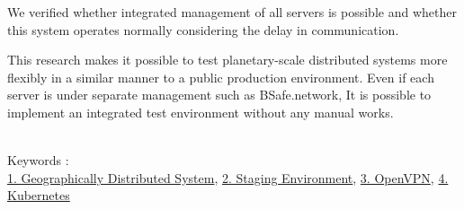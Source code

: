 We verified whether integrated management of all servers is possible and whether this system operates normally considering the delay in communication.

This research makes it possible to test planetary-scale distributed systems more flexibly in a similar manner to a public production environment.
Even if each server is under separate management such as BSafe.network,
It is possible to implement an integrated test environment without any manual works.

~ \\
Keywords : \\
\underline{1. Geographically Distributed System},
\underline{2. Staging Environment},
\underline{3. OpenVPN},
\underline{4. Kubernetes}
\begin{flushright}
\edept \\
\eauthor
\end{flushright}
